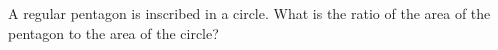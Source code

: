 A regular pentagon is inscribed in a circle. What is the ratio of the area of the pentagon to the area of the circle?
